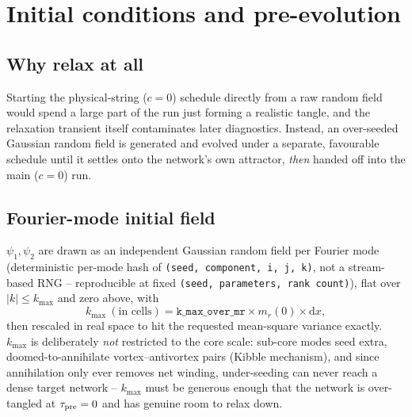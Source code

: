 \documentclass[11pt]{article}
\newcommand{\psivec}{\psi}
\begin{document}
\section{Initial conditions and pre-evolution}
\label{sec:preevolution}

\subsection{Why relax at all}
Starting the physical-string ($c=0$) schedule directly from a raw random field would spend a large part of
the run just forming a realistic tangle, and the relaxation transient itself contaminates later
diagnostics. Instead, an over-seeded Gaussian random field is generated and evolved under a separate,
favourable schedule until it settles onto the network's own attractor, \emph{then} handed off into the main
($c=0$) run.

\subsection{Fourier-mode initial field}
$\psivec_1,\psivec_2$ are drawn as an independent Gaussian random field per Fourier mode (deterministic
per-mode hash of \texttt{(seed, component, i, j, k)}, not a stream-based RNG -- reproducible at fixed
\texttt{(seed, parameters, rank count)}), flat over $|k|\le k_{\max}$ and zero above, with
\[
k_{\max}\ (\text{in cells}) = \texttt{k\_max\_over\_mr}\times m_r(0)\times \mathrm{d}x,
\]
then rescaled in real space to hit the requested mean-square variance exactly. $k_{\max}$ is deliberately
\emph{not} restricted to the core scale: sub-core modes seed extra, doomed-to-annihilate vortex--antivortex
pairs (Kibble mechanism), and since annihilation only ever removes net winding, under-seeding can never
reach a dense target network -- $k_{\max}$ must be generous enough that the network is over-tangled at
$\tau_{\rm pre}=0$ and has genuine room to relax down.
\end{document}
